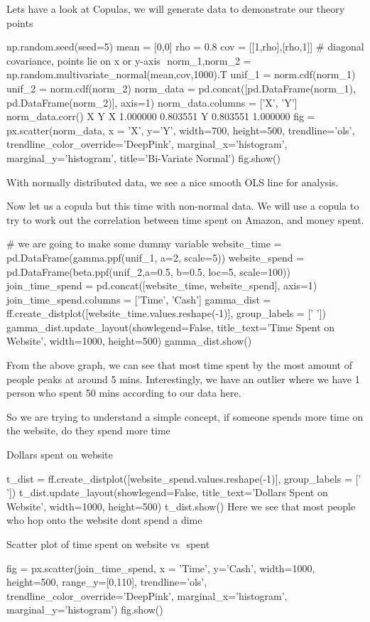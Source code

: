 Lets have a look at Copulas, we will generate data to demonstrate our theory points

np.random.seed(seed=5)
mean = [0,0]
rho = 0.8
cov = [[1,rho],[rho,1]] # diagonal covariance, points lie on x or y-axis
​
norm_1,norm_2 = np.random.multivariate_normal(mean,cov,1000).T
unif_1 = norm.cdf(norm_1)
unif_2 = norm.cdf(norm_2)
norm_data = pd.concat([pd.DataFrame(norm_1), pd.DataFrame(norm_2)], axis=1)
norm_data.columns = ['X', 'Y']
norm_data.corr()
X	Y
X	1.000000	0.803551
Y	0.803551	1.000000
fig = px.scatter(norm_data, x = 'X', y='Y', width=700, height=500, trendline='ols', trendline_color_override='DeepPink', marginal_x='histogram', marginal_y='histogram', title='Bi-Variate Normal')
fig.show()

With normally distributed data, we see a nice smooth OLS line for analysis.

Now let us a copula but this time with non-normal data. We will use a copula to try to work out the correlation between time spent on Amazon, and money spent.

# we are going to make some dummy variable
website_time = pd.DataFrame(gamma.ppf(unif_1, a=2, scale=5))
website_spend =  pd.DataFrame(beta.ppf(unif_2,a=0.5, b=0.5, loc=5, scale=100))
join_time_spend = pd.concat([website_time, website_spend], axis=1)
join_time_spend.columns = ['Time', 'Cash']
gamma_dist  = ff.create_distplot([website_time.values.reshape(-1)], group_labels = [' '])
gamma_dist.update_layout(showlegend=False, title_text='Time Spent on Website', width=1000, height=500)
gamma_dist.show()

From the above graph, we can see that most time spent by the most amount of people peaks at around 5 mins. Interestingly, we have an outlier where we have 1 person who spent 50 mins according to our data here.

So we are trying to understand a simple concept, if someone spends more time on the website, do they spend more time

Dollars spent on website

t_dist  = ff.create_distplot([website_spend.values.reshape(-1)], group_labels = [' '])
t_dist.update_layout(showlegend=False, title_text='Dollars Spent on Website', width=1000, height=500)
t_dist.show()
Here we see that most people who hop onto the website dont spend a dime

Scatter plot of time spent on website vs $$ spent

fig = px.scatter(join_time_spend, x = 'Time', y='Cash', width=1000, height=500,  range_y=[0,110], trendline='ols', trendline_color_override='DeepPink',  marginal_x='histogram', marginal_y='histogram')
fig.show()


